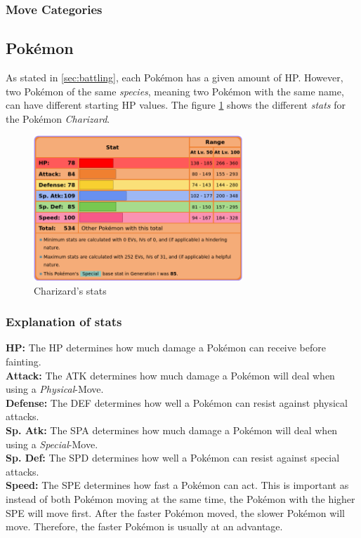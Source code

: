 \subsubsection{Move Categories}

\subsection{Pokémon}
\label{sec:pokemon}
As stated in \ref{sec:battling}, each Pokémon has a given amount of \ac{HP}. However, two Pokémon of the same 
\textit{species}, meaning two Pokémon with the same name, can have different starting \ac{HP} values. The figure
\ref{fig:charizard-stats} shows the different \textit{stats} for the Pokémon \textit{Charizard}.
\begin{figure}
	\centering
	\includegraphics[width=0.7\textwidth]{images/charizard-stats.png}
	\caption{Charizard's stats \cite{Bulbapedia:Charizard}}
	\label{fig:charizard-stats}
\end{figure}
\subsubsection{Explanation of stats}
\textbf{HP:} The \ac{HP} determines how much damage a Pokémon can receive before fainting. \\
\textbf{Attack:} The \ac{ATK} determines how much damage a Pokémon will deal when using 
a \textit{Physical}-Move. \\
\textbf{Defense:} The \ac{DEF} determines how well a Pokémon can resist against physical attacks. \\
\textbf{Sp. Atk:} The \ac{SPA} determines how much damage a Pokémon will deal when using
a \textit{Special}-Move. \\
\textbf{Sp. Def:} The \ac{SPD} determines how well a Pokémon can resist against special attacks. \\
\textbf{Speed:} The \ac{SPE} determines how fast a Pokémon can act. This is important as instead of
both Pokémon moving at the same time, the Pokémon with the higher \ac{SPE} will move first. After 
the faster Pokémon moved, the slower Pokémon will move. Therefore, the faster Pokémon is usually at an
advantage. 

